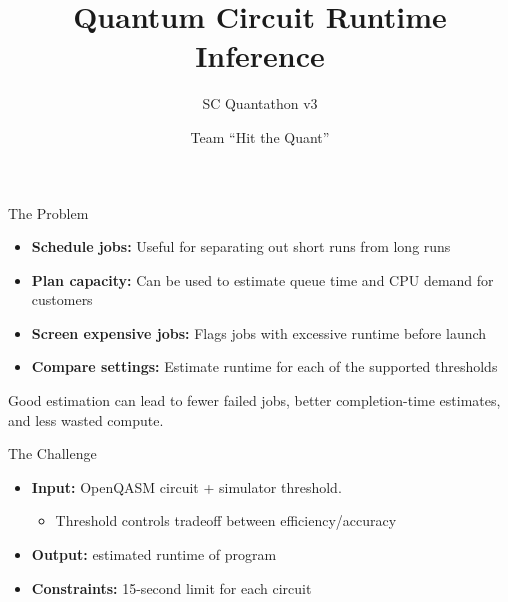 \documentclass[10pt,aspectratio=169]{beamer}
\title{Quantum Circuit Runtime Inference}
\subtitle{SC Quantathon v3}
\date{}
\author{Team ``Hit the Quant''}
\begin{document}
\begin{frame}
\titlepage
\end{frame}

\begin{frame}{The Problem}
\begin{itemize}
\item \textbf{Schedule jobs:} Useful for separating out short runs from long runs
\item \textbf{Plan capacity:} Can be used to estimate queue time and CPU demand for customers
\item \textbf{Screen expensive jobs:} Flags jobs with excessive runtime before launch
\item \textbf{Compare settings:} Estimate runtime for each of the supported thresholds
\end{itemize}

Good estimation can lead to fewer failed jobs, better completion-time estimates, and less wasted compute.
\end{frame}

\begin{frame}{The Challenge}
\begin{itemize}
\item \textbf{Input:} OpenQASM circuit + simulator threshold.
\begin{itemize}
\item Threshold controls tradeoff between efficiency/accuracy
\end{itemize}
\item \textbf{Output:} estimated runtime of program
\item \textbf{Constraints:} 15-second limit for each circuit
\end{itemize}\par
\vspace{1em}
\centering
{}\par
\smallskip
\end{frame}
\end{document}
